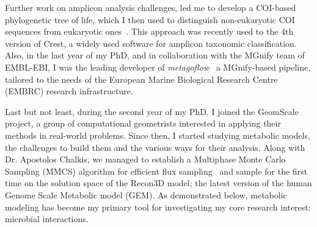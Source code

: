     Further work on amplicon analysis challenges, led me to develop a
    COI-based phylogenetic tree of life, which I then used to distinguish 
    non-eukaryotic COI sequences from eukaryotic ones~\cite{zafeiropoulos2021darn}.
    This approach was recently used to the 4th version of Crest, a widely used software 
    for amplicon taxonomic classification.
    Also, in the last year of my PhD, and in collaboration with the MGnify team of EMBL-EBI,
    I was the leading developer of \textit{metagoflow}~\cite{zafeiropoulos2023metagoflow} 
    a MGnify-based pipeline, tailored to the needs of the 
    European Marine Biological Research Centre (EMBRC) research infrastructure. 

    Last but not least, during the second year of my PhD, I joined the GeomScale project, 
    a group of computational geometrists interested in applying their methods in real-world problems. 
    Since then, I started studying metabolic models, the challenges to build them and 
    the various ways for their analysis.
    Along with Dr. Apostolos Chalkis, we managed to establish a Multiphase Monte Carlo Sampling (MMCS) 
    algorithm for efficient flux sampling~\cite{socg2021} and sample for the first time on the solution space
    of the Recon3D model; the latest version of the human Genome Scale Metabolic model (GEM).
    As demonstrated below, metabolic modeling has become my primary tool for investigating 
    my core research interest: microbial interactions.




